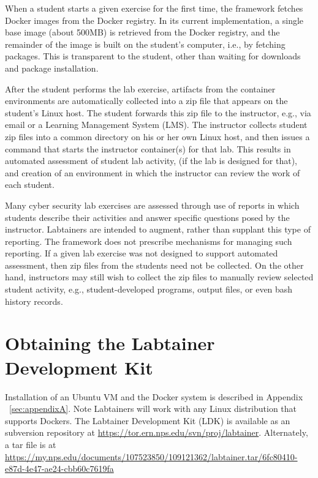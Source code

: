 \documentclass{article}
\begin{document}
When a student starts a given exercise for the first time, the framework fetches
Docker images from the Docker registry.  In its current implementation, a single
base image (about 500MB) is retrieved from the Docker registry, and the remainder of the image
is built on the student's computer, i.e., by fetching packages. This is transparent to
the student, other than waiting for downloads and package installation. 

After the student performs the lab exercise, artifacts from the container
environments are automatically collected into a zip file that appears on
the student's Linux host.  The student forwards this zip file to the instructor,
e.g., via email or a Learning Management System (LMS).  The instructor collects student zip files into a common
directory on his or her own Linux host, and then issues a command that starts
the instructor container(s) for that lab.  This results in automated assessment of student lab
activity, (if the lab is designed for that), and creation of an environment
in which the instructor can review the work of each student.

Many cyber security lab exercises are assessed through use of reports in which students
describe their activities and answer specific questions posed by the instructor.  Labtainers
are intended to augment, rather than supplant this type of reporting.  The framework does not
prescribe mechanisms for managing such reporting.  If a given lab exercise was not designed
to support automated assessment, then zip files from the students need not be collected.  On
the other hand, instructors may still wish to collect the zip files to manually review selected
student activity, e.g., student-developed programs, output files, or even bash history records.  

\section {Obtaining the Labtainer Development Kit}
Installation of an Ubuntu VM and the Docker system is described
in Appendix ~\ref{sec:appendixA}.  Note Labtainers will work with any Linux
distribution that supports Dockers.  
The Labtainer Development Kit (LDK) is available as an subversion repository at
\url{https://tor.ern.nps.edu/svn/proj/labtainer}.  Alternately, a tar file
is at 
\url{https://my.nps.edu/documents/107523850/109121362/labtainer.tar/6fc80410-e87d-4e47-ae24-cbb60c7619fa}
\end{document}
